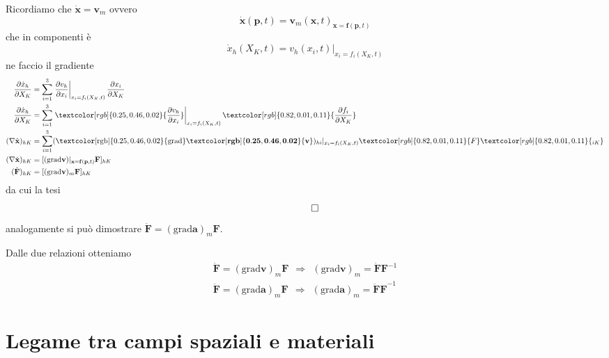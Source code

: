 \documentclass[10pt,a4paper,twoside]{book}
\begin{document}
Ricordiamo che $\dot{\mathbf{x}} =\mathbf{v}_{m}$ ovvero
\begin{equation*}
\dot{\mathbf{x}}(\mathbf{p} ,t) =\mathbf{v}_{m}(\mathbf{x} ,t)_{\mathbf{x} =\mathbf{f}(\mathbf{p} ,t)}
\end{equation*}
che in componenti è
\begin{equation*}
\dot{x}_{h}( X_{K} ,t) =v_{h}( x_{i} ,t) |_{x_{i} =f_{i}( X_{K} ,t)}
\end{equation*}
ne faccio il gradiente
\begin{align*}
\frac{\partial \dot{x}_{h}}{\partial X_{K}} & =\sum ^{3}_{i=1}\left. \frac{\partial v_{h}}{\partial x_{i}}\right| _{x_{i} =f_{i}( X_{K} ,t)}\frac{\partial x_{i}}{\partial X_{K}}\\
\frac{\partial \dot{x}_{h}}{\partial X_{K}} & =\sum ^{3}_{i=1}\left. \textcolor[rgb]{0.25,0.46,0.02}{\frac{\partial v_{h}}{\partial x_{i}}}\right| _{x_{i} =f_{i}( X_{K} ,t)}\textcolor[rgb]{0.82,0.01,0.11}{\frac{\partial f_{i}}{\partial X_{K}}}\\
( \nabla \dot{\mathbf{x}})_{hK} & =\sum ^{3}_{i=1}(\mathrm{\textcolor[rgb]{0.25,0.46,0.02}{grad}}\mathbf{\textcolor[rgb]{0.25,0.46,0.02}{v}})_{hi}| _{x_{i} =f_{i}( X_{K} ,t)}\textcolor[rgb]{0.82,0.01,0.11}{F}\textcolor[rgb]{0.82,0.01,0.11}{_{iK}}\\
( \nabla \dot{\mathbf{x}})_{hK} & =[(\mathrm{grad}\mathbf{v})| _{\mathbf{x} =\mathbf{f}(\mathbf{p} ,t)}\mathbf{F}]_{hK}\\
(\dot{\mathbf{F}})_{hK} & =[(\mathrm{grad}\mathbf{v})_{m}\mathbf{F}]_{hK}
\end{align*}
da cui la tesi
\begin{equation*}
\qed 
\end{equation*}
analogamente si può dimostrare $\boxed{\ddot{\mathbf{F}} =(\mathrm{grad}\mathbf{a})_{m}\mathbf{F}}$.

Dalle due relazioni otteniamo
\begin{gather*}
\dot{\mathbf{F}} =(\mathrm{grad}\mathbf{v})_{m}\mathbf{F} \ \ \Rightarrow \ \ \boxed{(\mathrm{grad}\mathbf{v})_{m} =\dot{\mathbf{F}}\mathbf{F}^{-1}}\\
\ddot{\mathbf{F}} =(\mathrm{grad}\mathbf{a})_{m}\mathbf{F} \ \ \Rightarrow \ \ \boxed{(\mathrm{grad}\mathbf{a})_{m} =\mathbf{\ddot{\mathbf{F}} F}^{-1}}
\end{gather*}
\section{Legame tra campi spaziali e materiali}
\end{document}
